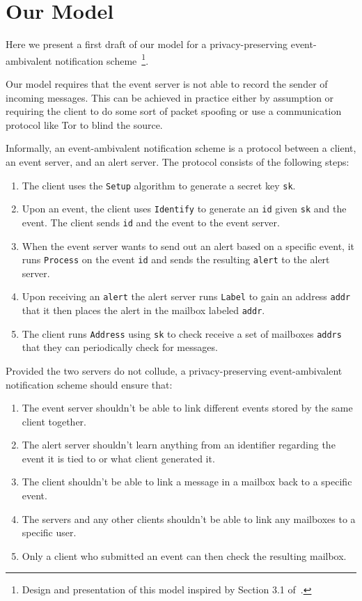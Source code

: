 \section*{Our Model}

Here we present a first draft of our model for a privacy-preserving
event-ambivalent notification scheme~\footnote{Design and presentation of this
model inspired by Section 3.1 of~\cite{CK:eurocrypt20}.}.\par

Our model requires that the event server is not able to record the sender of
incoming messages. This can be achieved in practice either by assumption or
requiring the client to do some sort of packet spoofing or use a communication
protocol like Tor to blind the source.

Informally, an event-ambivalent notification scheme is a protocol between a
client, an event server, and an alert server. The protocol consists of the
following steps:\par

\begin{enumerate}
  \item The client uses the \texttt{Setup} algorithm to generate a secret key
    \texttt{sk}.
  \item Upon an event, the client uses \texttt{Identify} to generate an
    \texttt{id} given \texttt{sk} and the event. The client sends \texttt{id}
    and the event to the event server.
  \item When the event server wants to send out an alert based on a specific
    event, it runs \texttt{Process} on the event \texttt{id} and sends the 
    resulting \texttt{alert} to the alert server.
  \item Upon receiving an \texttt{alert} the alert server runs \texttt{Label} to
    gain an address \texttt{addr} that it then places the alert in the mailbox
    labeled \texttt{addr}.
  \item The client runs \texttt{Address} using \texttt{sk} to check receive a
    set of mailboxes \texttt{addrs} that they can periodically check for
    messages.
\end{enumerate}

Provided the two servers do not collude, a privacy-preserving event-ambivalent
notification scheme should ensure that:\par
\begin{enumerate}
  \item The event server shouldn't be able to link different events stored by the
    same client together.
  \item The alert server shouldn't learn anything from an identifier regarding the
    event it is tied to or what client generated it.
  \item The client shouldn't be able to link a message in a mailbox back to a
    specific event.
  \item The servers and any other clients shouldn't be able to link any mailboxes
    to a specific user.
  \item Only a client who submitted an event can then check the resulting mailbox.
\end{enumerate}

